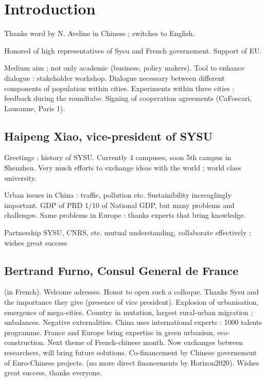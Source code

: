 


\section*{Introduction}

Thanks word by N. Aveline in Chinese ; switches to English.

Honored of high representatives of Sysu and French governement. Support of EU.

Medium aim ; not only academic (business, policy makers). Tool to enhance dialogue : stakeholder workshop. Dialogue necessary between different components of population within cities. Experiments within three cities : feedback during the roundtabe. Signing of cooperation agreements (CaFoscari, Lausanne, Paris 1).


\subsection*{Haipeng Xiao, vice-president of SYSU}

Greetings ; history of SYSU. Currently 4 campuses, soon 5th campus in Shenzhen. Very much efforts to exchange ideas with the world ; world class university.

Urban issues in China : traffic, pollution etc. Sustainibility increaglingly important. GDP of PRD 1/10 of National GDP, but many problems and challenges. Same problems in Europe : thanks experts that bring knowledge.

Partnership SYSU, CNRS, etc. mutual understanding, collaborate effectively ; wishes great success

\subsection*{Bertrand Furno, Consul General de France}

(in French). Welcome adresses. Honor to open such a colloque.  Thanks Sysu and the importance they give (presence of vice president). Explosion of urbanisation, emergence of mega-cities. Country in mutation, largest rural-urban migration ; unbalances. Negative externalities. China uses international experts : 1000 talents programme. France and Europe bring expertise in green urbanism, eco-construction. Next theme of French-chinese month. Now exchanges between researchers, will bring future solutions. Co-financement by Chinese governement of Euro-Chinese projects. (no more direct financements by Horizon2020). Wishes great success, thanks everyone.


